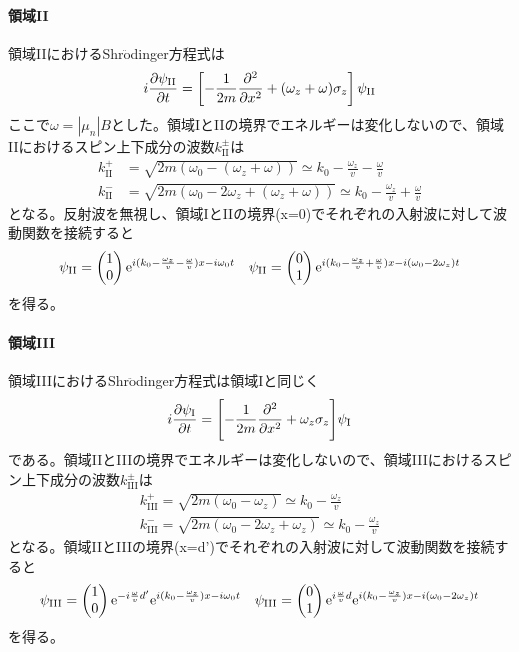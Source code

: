 \paragraph{領域II}
領域IIにおけるShr$\ddot{\mathrm{o}}$dinger方程式は
\begin{equation}
i\frac{\partial \psi_\mathrm{II}}{\partial t}= \left[-\frac{1}{2m} \frac{\partial^2}{\partial x^2} +(\omega_z+\omega) \sigma_z\right] \psi_\mathrm{II}
\end{equation}
ここで$\omega=|\mu_n|B$とした。領域IとIIの境界でエネルギーは変化しないので、領域IIにおけるスピン上下成分の波数$k^\pm_\mathrm{II}$は
\begin{align}
k^+_\mathrm{II}&=\sqrt{2m(\omega_0-(\omega_z+\omega))}\simeq k_0 -\frac{\omega_z}{v}-\frac{\omega}{v}\\
k^-_\mathrm{II}&=\sqrt{2m(\omega_0-2\omega_z+(\omega_z+\omega))}\simeq k_0 -\frac{\omega_z}{v}+\frac{\omega}{v}
\end{align}
となる。反射波を無視し、領域IとIIの境界(x=0)でそれぞれの入射波に対して波動関数を接続すると
\begin{align}
\psi_\mathrm{II}=\begin{pmatrix} 1\\0 \end{pmatrix} \mathrm{e}^{i (k_0-\frac{\omega_z}{v}-\frac{\omega}{v})x -i\omega_0 t} && \psi_\mathrm{II}=\begin{pmatrix} 0\\1 \end{pmatrix} \mathrm{e}^{i (k_0-\frac{\omega_z}{v} +\frac{\omega}{v}) x -i(\omega_0-2\omega_z) t}
\end{align}
を得る。

\paragraph{領域III}
領域IIIにおけるShr$\ddot{\mathrm{o}}$dinger方程式は領域Iと同じく
\begin{equation}
i\frac{\partial \psi_\mathrm{I}}{\partial t}= \Biggl[-\frac{1}{2m} \frac{\partial^2}{\partial x^2} +\omega_z \sigma_z\Biggr] \psi_\mathrm{I}
\end{equation}
である。領域IIとIIIの境界でエネルギーは変化しないので、領域IIIにおけるスピン上下成分の波数$k^\pm_\mathrm{III}$は
\begin{align}
k^+_\mathrm{III}=\sqrt{2m(\omega_0-\omega_z)}\simeq k_0 -\frac{\omega_z}{v}\\
k^-_\mathrm{III}=\sqrt{2m(\omega_0-2\omega_z+\omega_z)}\simeq k_0 -\frac{\omega_z}{v}
\end{align}
となる。領域IIとIIIの境界(x=d')でそれぞれの入射波に対して波動関数を接続すると
\begin{align}
\psi_\mathrm{III}=\begin{pmatrix} 1\\0 \end{pmatrix} \mathrm{e}^{-i\frac{\omega}{v}d'} \mathrm{e}^{i (k_0-\frac{\omega_z}{v})x -i\omega_0 t} && \psi_\mathrm{III}=\begin{pmatrix} 0\\1 \end{pmatrix} \mathrm{e}^{i\frac{\omega}{v}d} \mathrm{e}^{i (k_0-\frac{\omega_z}{v}) x -i(\omega_0-2\omega_z) t}
\end{align}
を得る。

